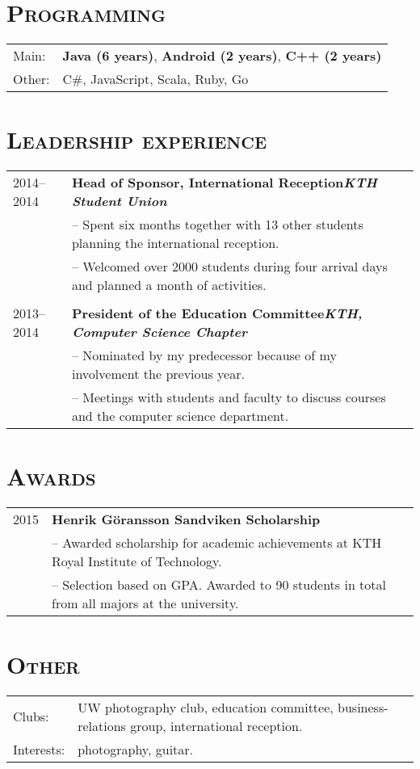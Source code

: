 \documentclass[10.5pt]{article}
\newenvironment{sect}[1][]
{ \section*{\textsc{#1}} \noindent \begin{tabular}{p{5.3em} p{48em}} }
{ \end{tabular} }
\begin{document}
\begin{sect}[Programming]
  Main:&\textbf{Java (6 years)}, \textbf{Android (2 years)}, \textbf{C++ (2 years)} \\
  Other:&C\#, JavaScript, Scala, Ruby, Go
\end{sect}
\vspace{1em}
\begin{sect}[Leadership experience]
  2014--2014&\textbf{Head of Sponsor, International Reception\hfill \textit{KTH Student Union}} \\
  &-- Spent six months together with 13 other students planning the international reception.\\
  &-- Welcomed over 2000 students during four arrival days and planned a month of activities. \\ \\

  2013--2014&\textbf{President of the Education Committee\hfill \textit{KTH, Computer Science Chapter}} \\
  &-- Nominated by my predecessor because of my involvement the previous year.\\
  &-- Meetings with students and faculty to discuss courses and the computer science department.
\end{sect}

\begin{sect}[Awards]
  2015&\textbf{Henrik Göransson Sandviken Scholarship} \\
  &-- Awarded scholarship for academic achievements at KTH Royal Institute of Technology.\\
  &-- Selection based on GPA. Awarded to 90 students in total from all majors at the university.
\end{sect}

\begin{sect}[Other]
  Clubs:&UW photography club, education committee, business-relations group, international reception. \\
  Interests:&photography, guitar.
\end{sect}
\end{document}
